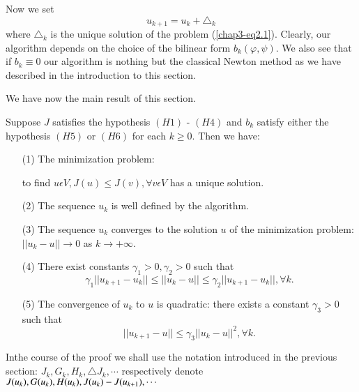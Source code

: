 Now we set 
$$
u_{k+1} = u_{k} + \triangle_{k}
$$
where $\triangle_{k}$ is the unique solution of the problem (\ref{chap3-eq2.1}). Clearly, our algorithm depends on the choice of the bilinear form $b_{k} (\varphi, \psi)$. We also see that if $b_{k} \equiv 0$ our algorithm is nothing but the classical Newton method as we have described in the introduction to this section.

We have now the main result of this section.

\begin{theorem}\label{chap3-thm2.1}
Suppose $J$ satisfies the hypothesis $(H1)$ - $(H4)$ and $b_{k}$ satisfy either the hypothesis $(H5)$ or $(H6)$ for each $k \geq 0$. Then we have:
\begin{enumerate}
\item[(1)] The minimization problem:

to find $u \epsilon V , J(u) \leq J(v) , \forall v \epsilon V$ has a unique solution.

\item[(2)] The sequence $u_{k}$ is well defined by the algorithm.

\item[(3)] The sequence $u_{k}$ converges to the solution $u$ of the minimization problem: $||u_{k} - u|| \to 0$ as $k \to + \infty$.

\item[(4)] There exist constants $\gamma_{1} > 0, \gamma_{2} > 0$ such that
$$
\gamma_{1} ||u_{k+1} - u_{k}|| \leq ||u_{k}-u|| \leq \gamma_{2} ||u_{k+1}-u_{k}||, \forall k.
$$

\item[(5)] The convergence of $u_{k}$ to $u$ is quadratic: there exists a constant $\gamma_{3} > 0$ such that
$$
||u_{k+1}-u|| \leq \gamma_{3} ||u_{k}-u||^{2}, \forall k.
$$
\end{enumerate}
\end{theorem}

In\pageoriginale the course of the proof we shall use the notation introduced in the previous section: $J_{k}, G_{k}, H_{k}, \triangle J_{k}, \cdots$ respectively denote $J(u_{k}), G(u_{k}),\break H(u_{k}), J(u_{k}) - J(u_{k+1}), \cdots$

